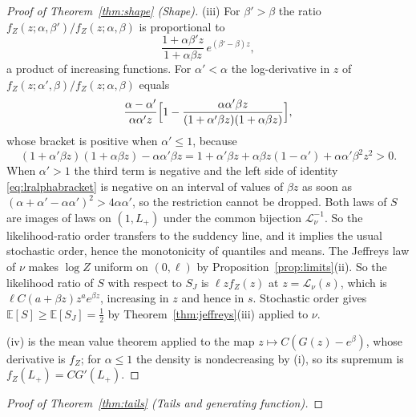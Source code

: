 \documentclass[sn-mathphys-num]{sn-jnl}\newcommand{\SNJNL}{}
\theoremstyle{thmstyleone}
\theoremstyle{thmstyletwo}
\theoremstyle{thmstylethree}
\theoremstyle{thmstyleone}
\providecommand{\E}{\mathbb{E}}
\providecommand{\Leh}{\mathscr{L}}
\begin{document}
\begin{appendices}
\begin{proof}[Proof of Theorem~\ref{thm:shape} (Shape)]
			\noindent(iii) For
			$\beta'>\beta$ the ratio $f_Z(z;\alpha,\beta')/f_Z(z;\alpha,\beta)$
			is proportional to
			\begin{equation}\label{eq:lrbeta}
				\frac{1+\alpha\beta'z}{1+\alpha\beta z}\,e^{(\beta'-\beta)z},
			\end{equation}
			a product of increasing functions. For $\alpha'<\alpha$ the log-derivative in $z$ of $f_Z(z;\alpha',\beta)/f_Z(z;\alpha,\beta)$
			equals
			\begin{equation}\label{eq:lralpha}
				\frac{\alpha-\alpha'}{\alpha\alpha'z}\Bigl[1-\frac{\alpha\alpha'\beta z}{(1+\alpha'\beta z)(1+\alpha\beta z)}\Bigr],
			\end{equation}
			whose bracket is positive when $\alpha'\le1$, because
			\begin{equation}\label{eq:lralphabracket}
				(1+\alpha'\beta z)(1+\alpha\beta z)-\alpha\alpha'\beta z
				=1+\alpha'\beta z+\alpha\beta z(1-\alpha')+\alpha\alpha'\beta^{2}z^{2}>0 .
			\end{equation}
			When $\alpha'>1$ the third term is negative and the left side of
			identity \eqref{eq:lralphabracket} is negative on an interval of
			values of $\beta z$ as soon as
			$(\alpha+\alpha'-\alpha\alpha')^{2}>4\alpha\alpha'$, so the
			restriction cannot be dropped. Both laws
			of $S$ are images of laws on $(1,L_+)$ under the common bijection
			$\Leh_\nu^{-1}$. So the likelihood-ratio order transfers to the
			suddency line, and it implies the usual stochastic order, hence
			the monotonicity of quantiles and means. The Jeffreys law of $\nu$
			makes $\log Z$ uniform on $(0,\ell)$ by
			Proposition~\ref{prop:limits}(ii). So the likelihood ratio of $S$
			with respect to $S_J$ is $\ell zf_Z(z)$ at $z=\Leh_\nu(s)$, which
			is $\ell C(a+\beta z)z^{a}e^{\beta z}$, increasing in $z$ and hence
			in $s$. Stochastic order gives $\E[S]\ge\E[S_J]=\tfrac12$ by
			Theorem~\ref{thm:jeffreys}(iii) applied to $\nu$.
			
			\noindent(iv) is the mean value theorem applied to the map
			$z\mapsto C(G(z)-e^{\beta})$, whose derivative is $f_Z$; for
			$\alpha\le1$ the density is nondecreasing by (i), so its supremum is
			$f_Z(L_+)=CG'(L_+)$.
		\end{proof}
		
		\begin{proof}[Proof of Theorem~\ref{thm:tails} (Tails and generating function)]\leavevmode
			

\end{proof}
\end{appendices}
\end{document}
